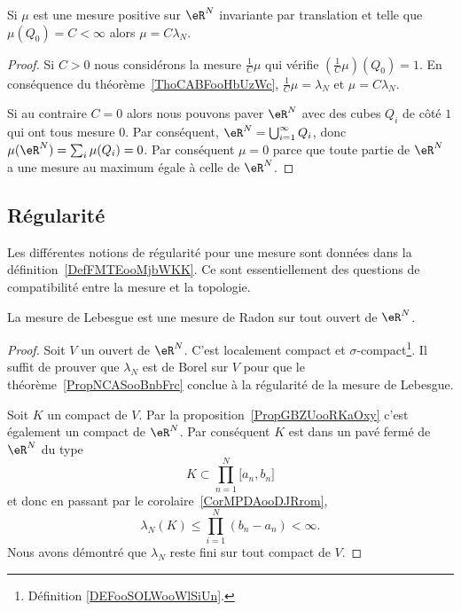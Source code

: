 \begin{corollary}       \label{CorKGMRooHWOQGP}
	Si \( \mu\) est une mesure positive sur \( \eR^N\) invariante par translation et telle que \( \mu(Q_0)=C<\infty\) alors \( \mu=C\lambda_N\).
\end{corollary}

\begin{proof}
	Si \( C>0\) nous considérons la mesure \( \frac{1}{ C }\mu\) qui vérifie \( (\frac{1}{ C }\mu)(Q_0)=1\). En conséquence du théorème~\ref{ThoCABFooHbUzWc}, \( \frac{1}{ C }\mu=\lambda_N\) et \( \mu=C\lambda_N\).

	Si au contraire \( C=0\) alors nous pouvons paver \( \eR^N\) avec des cubes \( Q_i\) de côté \( 1\) qui ont tous mesure \( 0\). Par conséquent, \( \eR^N=\bigcup_{i=1}^{\infty}Q_i\), donc \( \mu(\eR^N)=\sum_i\mu(Q_i)=0\). Par conséquent \( \mu=0\) parce que toute partie de \( \eR^N\) a une mesure au maximum égale à celle de \( \eR^N\).
\end{proof}

\subsection{Régularité}

Les différentes notions de régularité pour une mesure sont données dans la définition~\ref{DefFMTEooMjbWKK}. Ce sont essentiellement des questions de compatibilité entre la mesure et la topologie.
\begin{proposition}
	La mesure de Lebesgue est une mesure de Radon sur tout ouvert de \( \eR^N\).
\end{proposition}

\begin{proof}
	Soit \( V\) un ouvert de \( \eR^N\). C'est localement compact et \( \sigma\)-compact\footnote{Définition \ref{DEFooSOLWooWlSiUn}.}. Il suffit de prouver que \( \lambda_N\) est de Borel sur \( V\) pour que le théorème~\ref{PropNCASooBnbFrc} conclue à la régularité de la mesure de Lebesgue.

	Soit \( K\) un compact de \( V\). Par la proposition~\ref{PropGBZUooRKaOxy} c'est également un compact de \( \eR^N\). Par conséquent \( K\) est dans un pavé fermé de \( \eR^N\) du type
	\begin{equation}
		K\subset \prod_{n=1}^N\mathopen[ a_n , b_n \mathclose]
	\end{equation}
	et donc en passant par le corolaire~\ref{CorMPDAooDJRrom},
	\begin{equation}
		\lambda_N(K)\leq \prod_{i=1}^N(b_n-a_n)<\infty.
	\end{equation}
	Nous avons démontré que \( \lambda_N\) reste fini sur tout compact de \( V\).
\end{proof}
